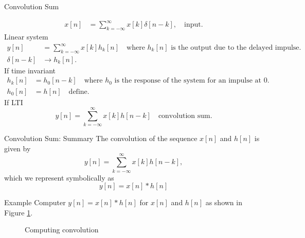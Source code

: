 \begin{frame}{Convolution Sum}
    {
    \begin{align*}
        x[n] &= \sum_{k=-\infty}^{\infty}x[k]\delta[n-k], \quad \text{input}.
    \end{align*}
    \pause
    Linear system
    \pause
    \begin{align*}
        y[n] &= \sum_{k=-\infty}^{\infty}x[k]h_k[n] \quad \text{where }h_k[n] \text{ is the output due to the delayed impulse}.\\
        \delta[n-k] &\rightarrow h_k[n].
    \end{align*}
    \pause
    If time invariant
    \pause
    \begin{align*}
        h_k[n] &= h_0[n-k] \quad \text{where }h_0 \text{ is the response of the system for an impulse at 0}.\\
        h_0[n] &= h[n] \quad \text{define}.
    \end{align*}
    \pause
    If LTI
    \begin{equation*}
        \boxed{y[n] = \sum_{k=-\infty}^{\infty}x[k]h[n-k]}\quad \text{convolution sum}.
    \end{equation*}

    }
\end{frame}




\begin{frame}{Convolution Sum: Summary}
    The convolution of the sequence $x[n]$ and $h[n]$ is given by
    \begin{equation}\label{eq:convolution_sum}
        y[n] = \sum_{k=-\infty}^{\infty}x[k]h[n-k],
    \end{equation}
    which we represent symbolically as
    \begin{equation}\label{eq:convolution_symbol}
        y[n] = x[n]\ast h[n]
    \end{equation}
\end{frame}


\begin{frame}{Example}
    Computer $y[n] = x[n]\ast h[n]$ for $x[n]$ and $h[n]$ as shown in Figure \ref{fi:example01_discrete_conv_signals}.
    {
    \begin{figure}
      \centering
      
      \caption{Computing convolution}\label{fi:example01_discrete_conv_signals}
    \end{figure}
    }
\end{frame}

